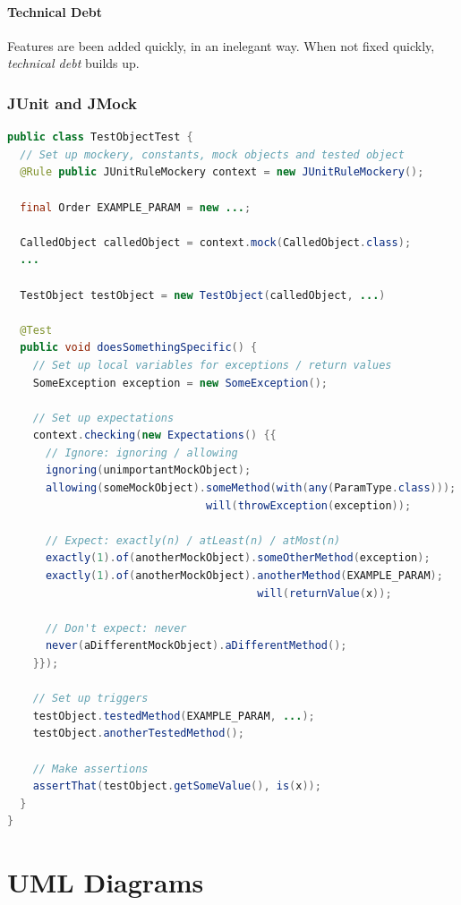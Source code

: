 \documentclass[twocolumn,english]{article}
\begin{document}
\paragraph{Technical Debt}

Features are been added quickly, in an inelegant way. When not fixed
quickly, \emph{technical debt} builds up.

\subsubsection*{JUnit and JMock}

\begin{lstlisting}[language=Java,basicstyle={\footnotesize\ttfamily},commentstyle={\color{gray}\itshape}]
public class TestObjectTest {
  // Set up mockery, constants, mock objects and tested object
  @Rule public JUnitRuleMockery context = new JUnitRuleMockery();

  final Order EXAMPLE_PARAM = new ...;

  CalledObject calledObject = context.mock(CalledObject.class);
  ...

  TestObject testObject = new TestObject(calledObject, ...)

  @Test
  public void doesSomethingSpecific() {
    // Set up local variables for exceptions / return values
    SomeException exception = new SomeException();

    // Set up expectations
    context.checking(new Expectations() {{
      // Ignore: ignoring / allowing
      ignoring(unimportantMockObject);
      allowing(someMockObject).someMethod(with(any(ParamType.class)));
                               will(throwException(exception));

      // Expect: exactly(n) / atLeast(n) / atMost(n)
      exactly(1).of(anotherMockObject).someOtherMethod(exception);
      exactly(1).of(anotherMockObject).anotherMethod(EXAMPLE_PARAM);
                                       will(returnValue(x));

      // Don't expect: never
      never(aDifferentMockObject).aDifferentMethod();
    }});
    
    // Set up triggers
    testObject.testedMethod(EXAMPLE_PARAM, ...);
    testObject.anotherTestedMethod();

    // Make assertions
    assertThat(testObject.getSomeValue(), is(x));
  }
}
\end{lstlisting}

\section{UML Diagrams}
\end{document}
